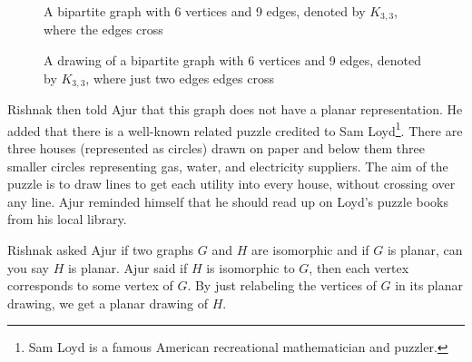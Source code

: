 \begin{figure}
\begin{center}
\caption{ A bipartite graph with 6 vertices and 9 edges, denoted by $K_{3,3}$, where the edges cross}\label{9g5}
\end{center}
\end{figure}
\begin{figure}
\begin{center}
\caption{ A  drawing of a bipartite graph with 6 vertices and 9 edges, denoted by $K_{3,3}$, where just two edges edges cross}\label{9g6}
\end{center}
\end{figure}
Rishnak then told Ajur that this graph does not have a planar representation. He added that there is a well-known related puzzle credited to Sam Loyd\footnote{Sam Loyd is a famous American recreational mathematician and puzzler.}. There are three houses (represented as circles) drawn on paper and below them three smaller circles representing gas, water, and electricity suppliers. The aim of the puzzle is to draw lines to get each utility into every house, without crossing over any line. Ajur reminded himself that he should read up on Loyd's puzzle books from his local library.

 Rishnak asked Ajur if two graphs $G$ and $H$ are isomorphic and if $G$ is planar, can you say $H$ is planar. Ajur said if $H$ is isomorphic to $G$, then each vertex corresponds to some vertex of $G$. By just relabeling the vertices of $G$ in its planar drawing, we get a planar drawing of $H$.
 
